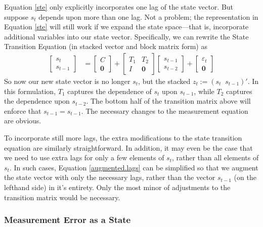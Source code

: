 \documentclass[a4paper,12pt]{article}
\begin{document}
Equation \ref{ste} only explicitly incorporates one lag of the state vector. But suppose $s_t$ depends upon more than one lag. Not a problem; the representation in Equation \ref{ste} will still work if we expand the state space---that is, incorporate additional variables into our state vector. Specifically, we can rewrite the State Transition Equation (in stacked vector and block matrix form) as 
\begin{align}
  \begin{bmatrix} s_{t} \\ s_{t-1}
  \end{bmatrix}
     &= 
  \begin{bmatrix} C \\ \mathbf{0} 
  \end{bmatrix}
  +\begin{bmatrix} T_1 & T_2 \\ I & \mathbf{0}
  \end{bmatrix}
  \begin{bmatrix} s_{t-1} \\ s_{t-2}
  \end{bmatrix}
  + \begin{bmatrix} 
      \varepsilon_{t}  \\ \mathbf{0}
    \end{bmatrix}
  \label{augmented.lags} 
\end{align}
So now our new state vector is no longer $s_t$, but the stacked $z_t:=(s_t \;\; s_{t-1})'$. In this formulation, $T_1$ captures the dependence of $s_t$ upon $s_{t-1}$, while $T_2$ captures the dependence upon $s_{t-2}$. The bottom half of the transition matrix above will enforce that $s_{t-1}=s_{t-1}$. The necessary changes to the measurement equation are obvious.

To incorporate still more lags, the extra modifications to the state transition equation are similarly straightforward. In addition, it may even be the case that we need to use extra lags for only a few elements of $s_t$, rather than all elements of $s_t$. In such cases, Equation \ref{augmented.lags} can be simplified so that we augment the state vector with only the necessary lags, rather than the vector $s_{t-1}$ (on the lefthand side) in it's entirety. Only the most minor of adjustments to the transition matrix would be necessary.


\subsubsection{Measurement Error as a State}
\end{document}
